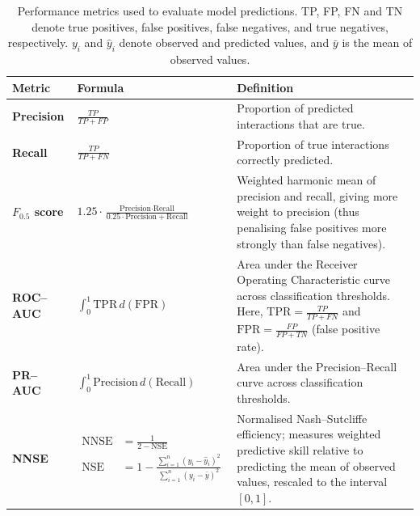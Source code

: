 \documentclass[oneside, a4paper, onecolumn, 11pt]{article}
\newcommand{\revtag}[1]{\textcolor{softcoral}{[#1]}}
\begin{document}
\begin{table}[H]
\footnotesize
\caption{Performance metrics used to evaluate model predictions. 
TP, FP, FN and TN denote true positives, false positives, false negatives, and true negatives, respectively. 
$y_i$ and $\hat{y}_i$ denote observed and predicted values, and $\bar{y}$ is the mean of observed values.}%
\label{tab:performance_metrics}
\renewcommand{\arraystretch}{1.65}
\begin{tabular}{
  >{\raggedright\arraybackslash}p{2.6cm}
  >{\raggedright\arraybackslash}p{5.2cm}
  >{\raggedright\arraybackslash}p{6.2cm}}
\hline
\textbf{Metric} & \textbf{Formula} & \textbf{Definition} \\
\hline

\textbf{Precision} 
& $\displaystyle \frac{TP}{TP + FP}$ 
& Proportion of predicted interactions that are true. \\

\textbf{Recall} 
& $\displaystyle \frac{TP}{TP + FN}$ 
& Proportion of true interactions correctly predicted. \\

\textbf{$F_{0.5}$ score} 
& $\displaystyle 1.25 \cdot \frac{\text{Precision}\cdot\text{Recall}}
{0.25 \cdot \text{Precision} + \text{Recall}}$
& Weighted harmonic mean of precision and recall, giving more weight to precision (thus penalising false positives more strongly than false negatives). \\

\textbf{ROC--AUC} 
& $\displaystyle \int_0^1 \mathrm{TPR}\, d(\mathrm{FPR})$
& Area under the Receiver Operating Characteristic curve across classification thresholds. 
Here, $\mathrm{TPR}=\frac{TP}{TP+FN}$ and $\mathrm{FPR}=\frac{FP}{FP+TN}$ (false positive rate). \\

\textbf{PR--AUC} 
& $\displaystyle \int_0^1 \text{Precision}\, d(\text{Recall})$
& Area under the Precision--Recall curve across classification thresholds. \\

\textbf{NNSE} 
& $\begin{aligned}
\mathrm{NNSE} &= \frac{1}{2-\mathrm{NSE}} \\
\mathrm{NSE} &= 1-\frac{\sum_{i=1}^{n}(y_i-\hat{y}_i)^2}
{\sum_{i=1}^{n}(y_i-\bar{y})^2}
\end{aligned}$
& Normalised Nash--Sutcliffe efficiency; measures weighted predictive skill 
relative to predicting the mean of observed values, rescaled to 
the interval $[0,1]$. \\


\hline
\end{tabular}
\end{table}
\end{document}
